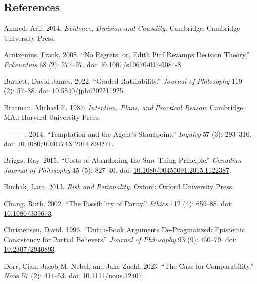 \documentclass[
  10pt,
  letterpaper,
  DIV=11,
  numbers=noendperiod,
  twoside]{scrartcl}
\newlength{\cslhangindent}
\newenvironment{CSLReferences}[2] %
 {\begin{list}{}{%
  \setlength{\itemindent}{0pt}
  \setlength{\leftmargin}{0pt}
  \setlength{\parsep}{0pt}
  \ifodd #1
   \setlength{\leftmargin}{\cslhangindent}
   \setlength{\itemindent}{-1\cslhangindent}
  \fi
  \setlength{\itemsep}{#2\baselineskip}}}
 {\end{list}}
\begin{document}
\subsection*{References}\label{references}

\label{refs}
\begin{CSLReferences}{1}{0}
Ahmed, Arif. 2014. \emph{Evidence, Decision and Causality}. Cambridge:
{C}ambridge {U}niversity {P}ress.

Arntzenius, Frank. 2008. {``No Regrets; or, Edith Piaf Revamps Decision
Theory.''} \emph{Erkenntnis} 68 (2): 277--97. doi:
\href{https://doi.org/10.1007/s10670-007-9084-8}{10.1007/s10670-007-9084-8}.

Barnett, David James. 2022. {``Graded Ratifiability.''} \emph{Journal of
Philosophy} 119 (2): 57--88. doi:
\href{https://doi.org/10.5840/jphil202211925}{10.5840/jphil202211925}.

Bratman, Michael E. 1987. \emph{Intention, Plans, and Practical Reason}.
Cambridge, MA.: Harvard University Press.

---------. 2014. {``Temptation and the Agent's Standpoint.''}
\emph{Inquiry} 57 (3): 293--310. doi:
\href{https://doi.org/10.1080/0020174X.2014.894271}{10.1080/0020174X.2014.894271}.

Briggs, Ray. 2015. {``Costs of Abandoning the Sure-Thing Principle.''}
\emph{Canadian Journal of Philosophy} 45 (5): 827--40. doi:
\href{https://doi.org/10.1080/00455091.2015.1122387}{10.1080/00455091.2015.1122387}.

Buchak, Lara. 2013. \emph{Risk and Rationality}. Oxford: Oxford
University Press.

Chang, Ruth. 2002. {``The Possibility of Parity.''} \emph{Ethics} 112
(4): 659--88. doi:
\href{https://doi.org/10.1086/339673}{10.1086/339673}.

Christensen, David. 1996. {``Dutch-Book Arguments {D}e-Pragmatized:
Epistemic Consistency for Partial Believers.''} \emph{Journal of
Philosophy} 93 (9): 450--79. doi:
\href{https://doi.org/10.2307/2940893}{10.2307/2940893}.

Dorr, Cian, Jacob M. Nebel, and Jake Zuehl. 2023. {``The Case for
Comparability.''} \emph{Noûs} 57 (2): 414--53. doi:
\href{https://doi.org/10.1111/nous.12407}{10.1111/nous.12407}.


\end{CSLReferences}
\end{document}
